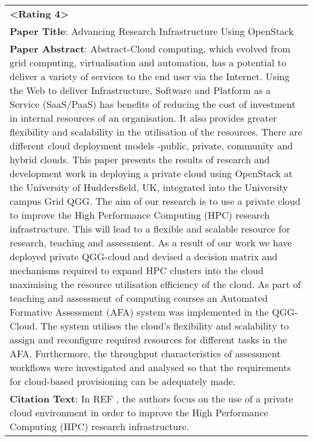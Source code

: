 \documentclass[11pt]{article}
\newcommand{\upv}{\vspace{-.0cm}}
\newcommand{\downv}{\vspace{-.1cm}}
\newcommand{\ourdata}{CiteSum\xspace}
\begin{document}
\begin{table*}[t]
{\begin{tabular}{p{15cm}}
                            \textbf{<Rating 4>} \\
                \textbf{Paper Title}: Advancing Research Infrastructure Using OpenStack\\
                \textbf{Paper Abstract}: Abstract-Cloud computing, which evolved from grid computing, virtualisation and automation, has a potential to deliver a variety of services to the end user via the Internet. Using the Web to deliver Infrastructure, Software and Platform as a Service (SaaS/PaaS) has benefits of reducing the cost of investment in internal resources of an organisation. It also provides greater flexibility and scalability in the utilisation of the resources. There are different cloud deployment models -public, private, community and hybrid clouds. This paper presents the results of research and development work in deploying a private cloud using OpenStack at the University of Huddersfield, UK, integrated into the University campus Grid QGG. The aim of our research is to use a private cloud to improve the High Performance Computing (HPC) research infrastructure. This will lead to a flexible and scalable resource for research, teaching and assessment. As a result of our work we have deployed private QGG-cloud and devised a decision matrix and mechanisms required to expand HPC clusters into the cloud maximising the resource utilisation efficiency of the cloud. As part of teaching and assessment of computing courses an Automated Formative Assessment (AFA) system was implemented in the QGG-Cloud. The system utilises the cloud's flexibility and scalability to assign and reconfigure required resources for different tasks in the AFA. Furthermore, the throughput characteristics of assessment workflows were investigated and analysed so that the requirements for cloud-based provisioning can be adequately made. \\
                \textbf{Citation Text}: In REF , the authors focus on the use of a private cloud environment in order to improve the High Performance Computing (HPC) research infrastructure. \\
 
            \bottomrule
        \end{tabular}
        }
    \upv
    \caption{Examples in \ourdata with different quality ratings. }
    \label{table_example_ratings2}
    \downv
    \end{table*} 
\end{document}
